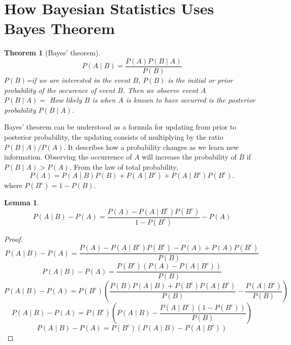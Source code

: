 \documentclass[lecture,12pt,]{pcms-l}
\numberwithin{section}{chapter}
\numberwithin{equation}{chapter}
\theoremstyle{plain}
\newtheorem{theorem}[equation]{Theorem}
\newtheorem{lemma}[equation]{Lemma}
\theoremstyle{definition}
\theoremstyle{definition}
\begin{document}
\section{How Bayesian Statistics Uses Bayes Theorem}
\begin{theorem}[Bayes' theorem]
\label{Bayes}
\[P(A\mid B)=\frac{P(A)P(B\mid A)}{P(B)}\]
$P(B)$=if we are interested in the event $B$, $P(B)$ is the initial or prior probability of the occurence of event $B$. Then we observe event $A$ 
\\
$P(B\mid A)=$ How likely $B$ is when $A$ is known to have occurred is the posterior probability $P(B\mid A)$. 
\end{theorem}
Bayes' theorem can be understood as a formula for updating from prior to posterior probability, the updating consists of multiplying by the ratio $P(B\mid A)/P(A)$. It describes how a probability changes as we learn new information. Observing the occurrence of $A$ will increase the probability of $B$ if $P(B\mid A)>P(A)$.
From the law of total probability,
\begin{equation}
P(A)=P(A\mid B)P(B)+P(A\mid B^c)+P(A\mid B^c)P(B^c).
\end{equation}
where $P(B^c)=1-P(B)$.
\begin{lemma}
\[P(A\mid B)-P(A)=\frac{P(A)-P(A\mid B^c)P(B^c)}{1-P(B^c)}-P(A)\]
\end{lemma}
 
\begin{proof}
\[P(A\mid B)-P(A)=\frac{P(A)-P(A\mid B^c)P(B^c)-P(A)+P(A)P(B^c)}{P(B)}\]
\[P(A\mid B)-P(A)=\frac{P(B^c)(P(A)-P(A\mid B^c))}{P(B)}\]
\[P(A\mid B)-P(A)=P(B^c)(\frac{P(B)P(A\mid B)+P(B^c)P(A\mid B^c)}{P(B)}-\frac{P(A\mid B^c)}{P(B)})\]
\[P(A\mid B)-P(A)=P(B^c)(P(A\mid B)-\frac{P(A\mid B^c)(1-P(B^c))}{P(B)})\]
\[P(A\mid B)-P(A)=P(B^c)(P(A\mid B)-P(A\mid B^c))\]
\end{proof}
\end{document}
